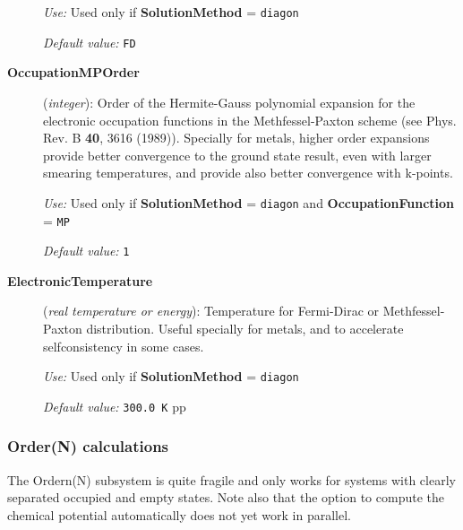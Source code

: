 \documentclass[11pt]{article}
\begin{document}
\begin{description}
{\it Use:} Used only if {\bf SolutionMethod} = {\tt diagon}

{\it Default value:} {\tt FD} 

\item[{\bf OccupationMPOrder}]({\it integer}):
Order of the Hermite-Gauss polynomial expansion for the
electronic occupation functions in the Methfessel-Paxton
scheme (see Phys. Rev. B  {\bf 40}, 3616 (1989)).
Specially for metals, higher order expansions provide better convergence
to the ground state result, even with larger smearing
temperatures, and provide also better convergence with k-points.


{\it Use:} Used only if {\bf SolutionMethod} = {\tt diagon}
and {\bf OccupationFunction} =  {\tt MP}

{\it Default value:} {\tt 1} 



\item[{\bf ElectronicTemperature}] ({\it real temperature or energy}): 
Temperature for Fermi-Dirac or Methfessel-Paxton
distribution. Useful specially for
metals, and to accelerate selfconsistency in some cases.

{\it Use:} Used only if {\bf SolutionMethod} = {\tt diagon}

{\it Default value:} {\tt 300.0 K}
pp

\end{description}

\subsubsection{Order(N) calculations}

The Ordern(N) subsystem is quite fragile and only works for systems
with clearly separated occupied and empty states. Note also that the
option to compute the chemical potential automatically does not yet
work in parallel.
\end{document}
